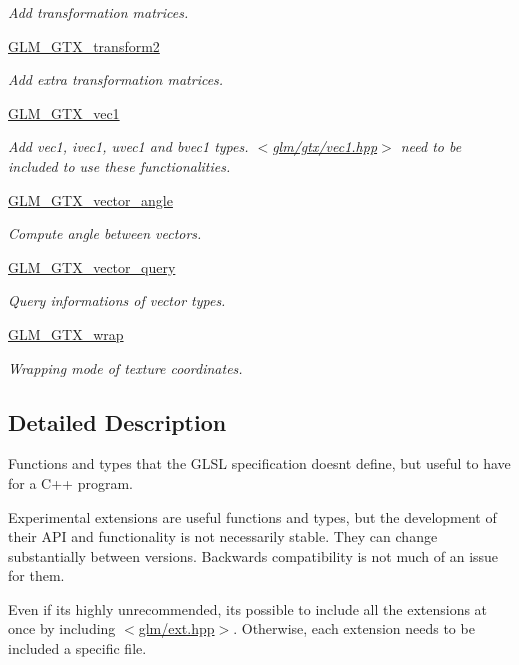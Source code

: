 \begin{DoxyCompactItemize}
\begin{DoxyCompactList}\small\item\em Add transformation matrices. \end{DoxyCompactList}\item 
\hyperlink{group__gtx__transform2}{G\+L\+M\+\_\+\+G\+T\+X\+\_\+transform2}
\begin{DoxyCompactList}\small\item\em Add extra transformation matrices. \end{DoxyCompactList}\item 
\hyperlink{group__gtx__vec1}{G\+L\+M\+\_\+\+G\+T\+X\+\_\+vec1}
\begin{DoxyCompactList}\small\item\em Add vec1, ivec1, uvec1 and bvec1 types. $<$\hyperlink{vec1_8hpp}{glm/gtx/vec1.\+hpp}$>$ need to be included to use these functionalities. \end{DoxyCompactList}\item 
\hyperlink{group__gtx__vector__angle}{G\+L\+M\+\_\+\+G\+T\+X\+\_\+vector\+\_\+angle}
\begin{DoxyCompactList}\small\item\em Compute angle between vectors. \end{DoxyCompactList}\item 
\hyperlink{group__gtx__vector__query}{G\+L\+M\+\_\+\+G\+T\+X\+\_\+vector\+\_\+query}
\begin{DoxyCompactList}\small\item\em Query informations of vector types. \end{DoxyCompactList}\item 
\hyperlink{group__gtx__wrap}{G\+L\+M\+\_\+\+G\+T\+X\+\_\+wrap}
\begin{DoxyCompactList}\small\item\em Wrapping mode of texture coordinates. \end{DoxyCompactList}\end{DoxyCompactItemize}


\subsection{Detailed Description}
Functions and types that the G\+L\+SL specification doesn\textquotesingle{}t define, but useful to have for a C++ program. 

Experimental extensions are useful functions and types, but the development of their A\+PI and functionality is not necessarily stable. They can change substantially between versions. Backwards compatibility is not much of an issue for them.

Even if it\textquotesingle{}s highly unrecommended, it\textquotesingle{}s possible to include all the extensions at once by including $<$\hyperlink{ext_8hpp}{glm/ext.\+hpp}$>$. Otherwise, each extension needs to be included a specific file. 